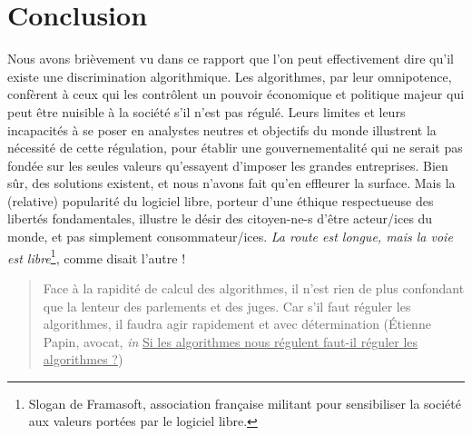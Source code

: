 \documentclass[a4paper,12pt]{report}
\begin{document}
\chapter*{Conclusion}

Nous avons brièvement vu dans ce rapport que l'on peut effectivement dire qu'il existe une discrimination algorithmique. Les algorithmes, par leur omnipotence, confèrent à ceux qui les contrôlent un pouvoir économique et politique majeur qui peut être nuisible à la société s'il n'est pas régulé. Leurs limites et leurs incapacités à se poser en analystes neutres et objectifs du monde illustrent la nécessité de cette régulation, pour établir une gouvernementalité qui ne serait pas fondée sur les seules valeurs qu'essayent d'imposer les grandes entreprises. Bien sûr, des solutions existent, et nous n'avons fait qu'en effleurer la surface. Mais la (relative) popularité du logiciel libre, porteur d'une éthique respectueuse des libertés fondamentales, illustre le désir des citoyen-ne-s d'être acteur/ices du monde, et pas simplement consommateur/ices. \textit{La route est longue, mais la voie est libre}\footnote{Slogan de Framasoft, association française militant pour sensibiliser la société aux valeurs portées par le logiciel libre.}, comme disait l'autre !

\begin{quotation}
 Face à la rapidité de calcul des algorithmes, il n’est rien de plus confondant que la lenteur des parlements et des juges. Car s’il faut réguler les algorithmes, il faudra agir rapidement et avec détermination (Étienne Papin, avocat, \textit{in} \underline{Si les algorithmes nous régulent faut-il réguler les algorithmes ?})
\end{quotation}


\appendix


\end{document}
